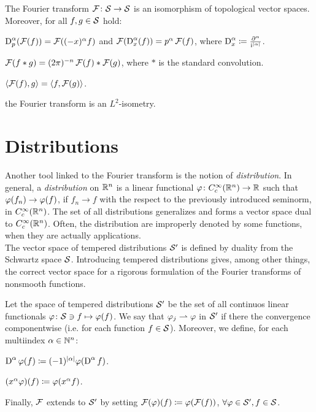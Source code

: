 \begin{nprop}
\label{prop:four_properties}
The Fourier transform $\operatorname{\mathcal{F}}\colon\mathcal{S}\to\mathcal{S}$ is an isomorphism of topological vector spaces. Moreover, for all $f,g\in\mathcal{S}$ hold:
\begin{compactenum}
\item $\operatorname{D}^{\alpha}_{p}(\operatorname{\mathcal{F}}(f))=\operatorname{\mathcal{F}}((-x)^{\alpha}f)$ and $\operatorname{\mathcal{F}}(\operatorname{D}_{x}^{\alpha}(f))=p^{\alpha}\operatorname{\mathcal{F}}(f)$, where $\operatorname{D}_{x}^{\alpha}\coloneqq\frac{\partial^{\alpha}}{\mathrm{i}^{\left| \alpha\right|}}$.
\item $\operatorname{\mathcal{F}}(f\ast g)=(2\pi)^{-n}\operatorname{\mathcal{F}}(f)\ast\operatorname{\mathcal{F}}(g)$, where $\ast$ is the standard convolution.
\item $\left< \operatorname{\mathcal{F}}(f),g\right>=\left< f,\operatorname{\mathcal{F}}(g)\right>$.
\item the Fourier transform is an $L^{2}$-isometry.
\end{compactenum}
\end{nprop}


\section{Distributions}


Another tool linked to the Fourier transform is the notion of \emph{distribution}. In general, a \emph{distribution} on $\mathbb{R}^{n}$ is a linear functional $\varphi\colon C_{c}^{\infty}(\mathbb{R}^{n})\to\mathbb{R}$ such that $\varphi(f_{n})\to\varphi(f)$, if $f_{n}\to f$ with the respect to the previously introduced seminorm, in $C_{c}^{\infty}(\mathbb{R}^{n})$. The set of all distributions generalizes and forms a vector space dual to $C_{c}^{\infty}(\mathbb{R}^{n})$. Often, the distribution are improperly denoted by some functions, when they are actually applications.\\
The vector space of tempered distributions $\mathcal{S}'$ is defined by duality from the Schwartz space $\mathcal{S}$. Introducing tempered distributions gives, among other things, the correct vector space for a rigorous formulation of the Fourier transforms of nonsmooth functions. 

\begin{defin}
\label{def:tempered_distrib}
Let the space of tempered distributions $\mathcal{S}'$ be the set of all continuos linear functionals $\varphi\colon\mathcal{S}\ni f\mapsto\varphi(f)$. We say that $\varphi_{j}\rightharpoonup\varphi$ in $\mathcal{S}'$ if there the convergence componentwise (i.e. for each function $f\in\mathcal{S}$). Moreover, we define, for each multiindex $\alpha\in\mathbb{N}^{n}$:
\begin{compactitem}
\item $\operatorname{D}^{\alpha}\varphi(f)\coloneqq (-1)^{\left| \alpha\right|}\varphi(\operatorname{D}^{\alpha}f)$.
\item $(x^{\alpha}\varphi)(f)\coloneqq\varphi(x^{\alpha} f)$.
\end{compactitem} 
Finally, $\operatorname{\mathcal{F}}$ extends to $\mathcal{S}'$ by setting $\operatorname{\mathcal{F}}(\varphi)(f)\coloneqq\varphi(\operatorname{\mathcal{F}}(f))$, $\forall\varphi\in\mathcal{S}',f\in\mathcal{S}$.
\end{defin}


